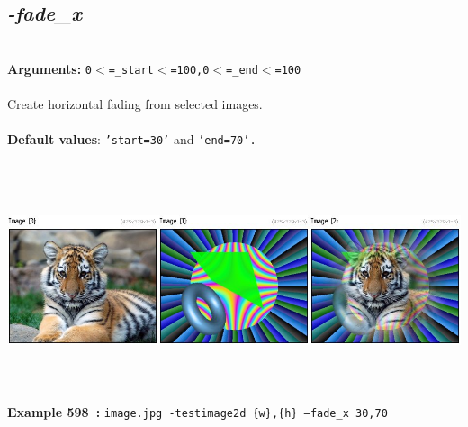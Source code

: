 \documentclass[a4paper,11pt,twoside]{book}
\begin{document}
\subsection{\emph{-fade\_x} }\vspace*{-0.5em}
~\\\textbf{Arguments: } 
{\small \texttt{0$<$=\_start$<$=100,0$<$=\_end$<$=100}}\\~\\
Create horizontal fading from selected images.
~\\~\\\textbf{Default values}: {\small \texttt{'start=30'} and \texttt{'end=70'.}}
\begin{center}\includegraphics[keepaspectratio=true,height=7cm,width=\textwidth]{img/gmic_def598.jpg}\\
{\footnotesize \textbf{Example 598~:} \texttt{image.jpg -testimage2d \{w\},\{h\} --fade\_x 30,70}}
\end{center}
\end{document}
